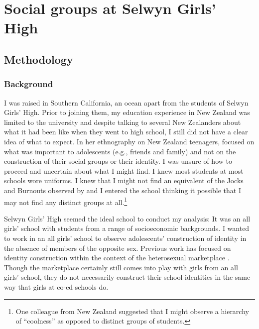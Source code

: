 \chapter{Social groups at Selwyn Girls' High}
\label{ch:ethnography}
\date{}





\section{Methodology}

\subsection{Background}

I was raised in Southern California, an ocean apart from the students of Selwyn Girls' High. Prior to joining them, my education experience in New Zealand was limited to the university and despite talking to several New Zealanders about what it had been like when they went to high school, I still did not have a clear idea of what to expect. In her ethnography on New Zealand teenagers, \citet{gray1988} focused on what was important to adolescents (e.g., friends and family) and not on the construction of their social groups or their identity. I was unsure of how to proceed and uncertain about what I might find. I knew most students at most schools wore uniforms. I knew that I might not find an equivalent of the Jocks and Burnouts observed by \citet{eckert1989} and I entered the school thinking it possible that I may not find any distinct groups at all.\footnote{One colleague from New Zealand suggested that I might observe a hierarchy of ``coolness'' as opposed to distinct groups of students.}   


Selwyn Girls' High seemed the ideal school to conduct my analysis: It was an all girls' school with students from a range of socioeconomic backgrounds. I wanted to work in an all girls' school to observe adolescents' construction of identity in the absence of members of the opposite sex. Previous work has focused on identity construction within the context of the heterosexual marketplace \citep{eckert1996nailpolish}. Though the marketplace certainly still comes into play with girls from an all girls' school, they do not necessarily construct their school identities in the same way that girls at co-ed schools do. 

